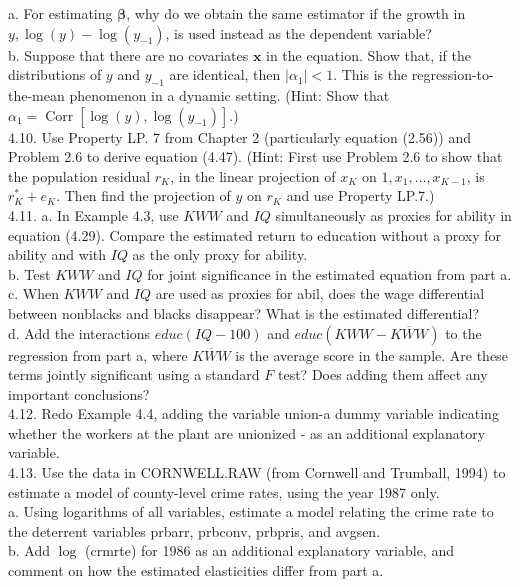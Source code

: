 \documentclass[10pt]{article}
\begin{document}
a. For estimating $\boldsymbol{\beta}$, why do we obtain the same estimator if the growth in $y, \log (y)- \log \left(y_{-1}\right)$, is used instead as the dependent variable?\\
b. Suppose that there are no covariates $\mathbf{x}$ in the equation. Show that, if the distributions of $y$ and $y_{-1}$ are identical, then $\left|\alpha_{1}\right|<1$. This is the regression-to-the-mean phenomenon in a dynamic setting. (Hint: Show that $\alpha_{1}=\operatorname{Corr}\left[\log (y), \log \left(y_{-1}\right)\right]$.)\\
4.10. Use Property LP. 7 from Chapter 2 (particularly equation (2.56)) and Problem 2.6 to derive equation (4.47). (Hint: First use Problem 2.6 to show that the population residual $r_{K}$, in the linear projection of $x_{K}$ on $1, x_{1}, \ldots, x_{K-1}$, is $r_{K}^{*}+e_{K}$. Then find the projection of $y$ on $r_{K}$ and use Property LP.7.)\\
4.11. a. In Example 4.3, use $K W W$ and $I Q$ simultaneously as proxies for ability in equation (4.29). Compare the estimated return to education without a proxy for ability and with $I Q$ as the only proxy for ability.\\
b. Test $K W W$ and $I Q$ for joint significance in the estimated equation from part a.\\
c. When $K W W$ and $I Q$ are used as proxies for abil, does the wage differential between nonblacks and blacks disappear? What is the estimated differential?\\
d. Add the interactions $e d u c(I Q-100)$ and $e d u c(K W W-\overline{K W W})$ to the regression from part a, where $\overline{K W W}$ is the average score in the sample. Are these terms jointly significant using a standard $F$ test? Does adding them affect any important conclusions?\\
4.12. Redo Example 4.4, adding the variable union-a dummy variable indicating whether the workers at the plant are unionized - as an additional explanatory variable.\\
4.13. Use the data in CORNWELL.RAW (from Cornwell and Trumball, 1994) to estimate a model of county-level crime rates, using the year 1987 only.\\
a. Using logarithms of all variables, estimate a model relating the crime rate to the deterrent variables prbarr, prbconv, prbpris, and avgsen.\\
b. Add $\log$ (crmrte) for 1986 as an additional explanatory variable, and comment on how the estimated elasticities differ from part a.\\
\end{document}
